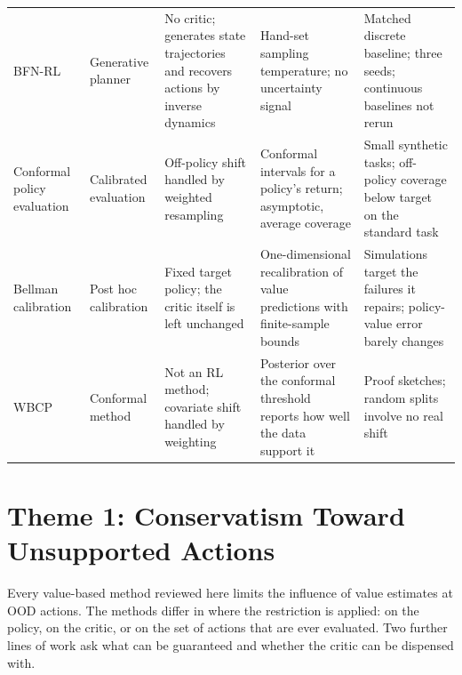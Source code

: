\documentclass[journal]{IEEEtran}
\begin{document}
\begin{table}[!t]
\begin{tabularx}{\textwidth}{@{}P{0.105\textwidth}P{0.095\textwidth}LLL@{}}
BFN-RL \cite{killingberg2026bfn} & Generative planner & No critic; generates state trajectories and recovers actions by inverse dynamics & Hand-set sampling temperature; no uncertainty signal & Matched discrete baseline; three seeds; continuous baselines not rerun \\
Conformal policy evaluation \cite{gan2025conformal} & Calibrated evaluation & Off-policy shift handled by weighted resampling & Conformal intervals for a policy's return; asymptotic, average coverage & Small synthetic tasks; off-policy coverage below target on the standard task \\
Bellman calibration \cite{vanderlaan2026bellman} & Post hoc calibration & Fixed target policy; the critic itself is left unchanged & One-dimensional recalibration of value predictions with finite-sample bounds & Simulations target the failures it repairs; policy-value error barely changes \\
WBCP \cite{lou2026wbcp} & Conformal method & Not an RL method; covariate shift handled by weighting & Posterior over the conformal threshold reports how well the data support it & Proof sketches; random splits involve no real shift \\
\bottomrule
\end{tabularx}
\end{table}

\section{Theme 1: Conservatism Toward Unsupported Actions}
\label{sec:theme1}
Every value-based method reviewed here limits the influence of value estimates at OOD actions. The methods differ in where the restriction is applied: on the policy, on the critic, or on the set of actions that are ever evaluated. Two further lines of work ask what can be guaranteed and whether the critic can be dispensed with.
\end{document}
